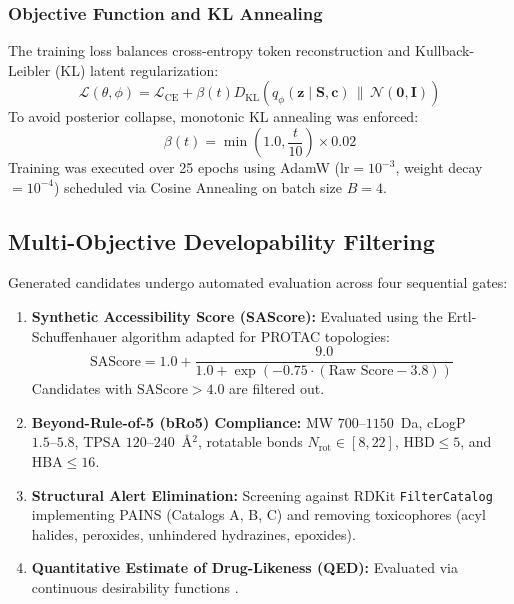 \documentclass[conference]{IEEEtran}
\begin{document}
\subsubsection{Objective Function and KL Annealing}
The training loss balances cross-entropy token reconstruction and Kullback-Leibler (KL) latent regularization:
\begin{equation}
\mathcal{L}(\theta, \phi) = \mathcal{L}_{\text{CE}} + \beta(t) D_{\text{KL}}\left(q_\phi(\mathbf{z}\mid\mathbf{S},\mathbf{c}) \,\|\, \mathcal{N}(\mathbf{0}, \mathbf{I})\right)
\end{equation}
To avoid posterior collapse, monotonic KL annealing was enforced:
\begin{equation}
\beta(t) = \min\left(1.0, \frac{t}{10}\right) \times 0.02
\end{equation}
Training was executed over 25 epochs using AdamW ($\text{lr} = 10^{-3}$, weight decay $= 10^{-4}$) scheduled via Cosine Annealing on batch size $B = 4$.

\subsection{Multi-Objective Developability Filtering}
Generated candidates undergo automated evaluation across four sequential gates:
\begin{enumerate}
    \item \textbf{Synthetic Accessibility Score (SAScore):} Evaluated using the Ertl-Schuffenhauer algorithm \cite{ertl2009} adapted for PROTAC topologies:
    \begin{equation}
    \text{SAScore} = 1.0 + \frac{9.0}{1.0 + \exp(-0.75 \cdot (\text{Raw Score} - 3.8))}
    \end{equation}
    Candidates with $\text{SAScore} > 4.0$ are filtered out.
    \item \textbf{Beyond-Rule-of-5 (bRo5) Compliance:} MW $700\text{--}1150$~Da, cLogP $1.5\text{--}5.8$, TPSA $120\text{--}240$~\AA$^2$, rotatable bonds $N_{\text{rot}} \in [8, 22]$, $\text{HBD} \le 5$, and $\text{HBA} \le 16$.
    \item \textbf{Structural Alert Elimination:} Screening against RDKit \texttt{FilterCatalog} implementing PAINS (Catalogs A, B, C) and removing toxicophores (acyl halides, peroxides, unhindered hydrazines, epoxides).
    \item \textbf{Quantitative Estimate of Drug-Likeness (QED):} Evaluated via continuous desirability functions \cite{bickerton2012}.
\end{enumerate}
\end{document}
